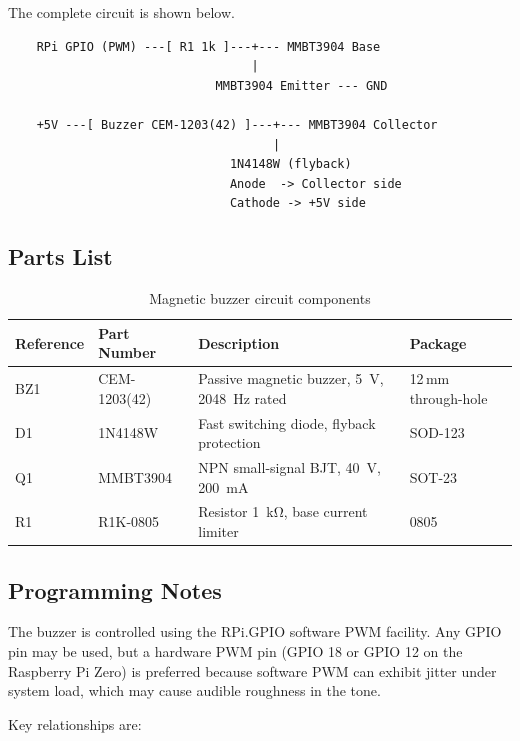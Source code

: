 \documentclass[border=10pt]{standalone}
\begin{document}
The complete circuit is shown below.

\begin{verbatim}
    RPi GPIO (PWM) ---[ R1 1k ]---+--- MMBT3904 Base
                                  |
                             MMBT3904 Emitter --- GND

    +5V ---[ Buzzer CEM-1203(42) ]---+--- MMBT3904 Collector
                                     |
                               1N4148W (flyback)
                               Anode  -> Collector side
                               Cathode -> +5V side
\end{verbatim}

\subsection{Parts List}

\begin{table}[h]
\centering
\begin{tabular}{llll}
\hline
\textbf{Reference} & \textbf{Part Number} & \textbf{Description} & \textbf{Package} \\
\hline
BZ1 & CEM-1203(42)  & Passive magnetic buzzer, \SI{5}{\volt}, \SI{2048}{\hertz} rated & 12\,mm through-hole \\
D1  & 1N4148W       & Fast switching diode, flyback protection                        & SOD-123 \\
Q1  & MMBT3904      & NPN small-signal BJT, \SI{40}{\volt}, \SI{200}{\milli\ampere}  & SOT-23  \\
R1  & R1K-0805      & Resistor \SI{1}{\kilo\ohm}, base current limiter               & 0805    \\
\hline
\end{tabular}
\caption{Magnetic buzzer circuit components}
\label{tab:buzzer_parts}
\end{table}

\subsection{Programming Notes}

The buzzer is controlled using the RPi.GPIO software PWM facility. Any GPIO pin may
be used, but a hardware PWM pin (GPIO 18 or GPIO 12 on the Raspberry Pi Zero) is
preferred because software PWM can exhibit jitter under system load, which may cause
audible roughness in the tone.

Key relationships are:
\end{document}
